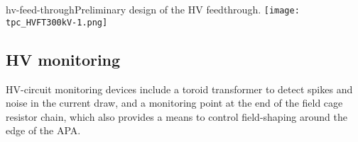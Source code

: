 \begin{cdrfigure}[HV feedthrough]{hv-feed-through}{Preliminary design of the HV feedthrough.}
\texttt{[image: tpc\_HVFT300kV-1.png]}
\end{cdrfigure}





\subsection{HV monitoring}

HV-circuit monitoring devices include a toroid transformer to detect
spikes and noise in the current draw, and a monitoring point at the end
of the field cage resistor chain, which also provides a means to
control field-shaping around the edge of the
APA.

